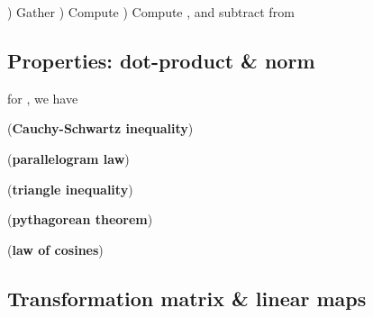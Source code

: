 \begin{itemize}
\begin{itemize}
                        \begin{enumerate}
                              )
                                    Gather
                              )
                                    Compute
                              )
                                    Compute , and
                                    subtract from 
                        \end{enumerate}
            \end{itemize}
\end{itemize}

\subsection*{Properties: dot-product \& norm}



for , we have

(\textbf{Cauchy-Schwartz inequality})

(\textbf{parallelogram law})

(\textbf{triangle inequality})

(\textbf{pythagorean theorem})

(\textbf{law of cosines})

\subsection*{Transformation matrix \& linear maps}


